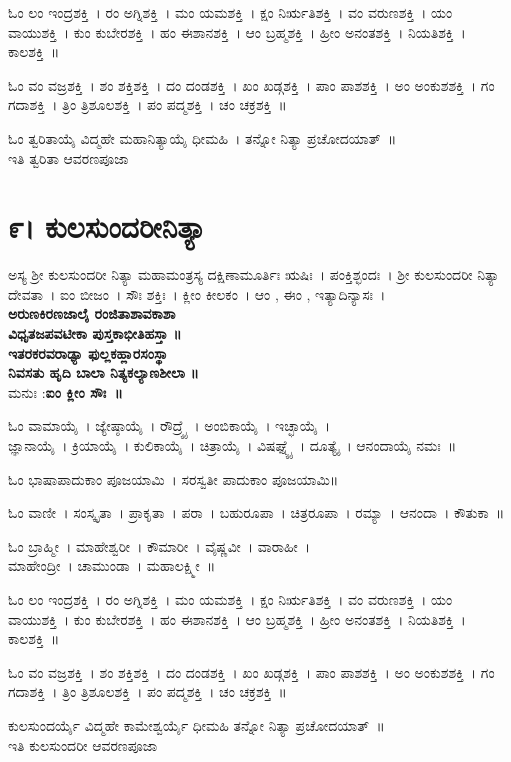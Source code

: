 ಓಂ ಲಂ ಇಂದ್ರಶಕ್ತಿ~।  ರಂ ಅಗ್ನಿಶಕ್ತಿ~।  ಮಂ ಯಮಶಕ್ತಿ~।  ಕ್ಷಂ ನಿರ್ಋತಿಶಕ್ತಿ~।  ವಂ ವರುಣಶಕ್ತಿ~।  ಯಂ ವಾಯುಶಕ್ತಿ~।  ಕುಂ ಕುಬೇರಶಕ್ತಿ~।  ಹಂ ಈಶಾನಶಕ್ತಿ~।  ಆಂ ಬ್ರಹ್ಮಶಕ್ತಿ~।  ಹ್ರೀಂ ಅನಂತಶಕ್ತಿ~।  ನಿಯತಿಶಕ್ತಿ~।  ಕಾಲಶಕ್ತಿ~॥ 

ಓಂ ವಂ ವಜ್ರಶಕ್ತಿ~।  ಶಂ ಶಕ್ತಿಶಕ್ತಿ~।  ದಂ ದಂಡಶಕ್ತಿ~।  ಖಂ ಖಡ್ಗಶಕ್ತಿ~।  ಪಾಂ ಪಾಶಶಕ್ತಿ~।  ಅಂ ಅಂಕುಶಶಕ್ತಿ~।  ಗಂ ಗದಾಶಕ್ತಿ~।  ತ್ರಿಂ ತ್ರಿಶೂಲಶಕ್ತಿ~।  ಪಂ ಪದ್ಮಶಕ್ತಿ~।  ಚಂ ಚಕ್ರಶಕ್ತಿ~॥ 

ಓಂ ತ್ವರಿತಾಯೈ ವಿದ್ಮಹೇ ಮಹಾನಿತ್ಯಾಯೈ ಧೀಮಹಿ~। ತನ್ನೋ ನಿತ್ಯಾ ಪ್ರಚೋದಯಾತ್~॥\\
ಇತಿ ತ್ವರಿತಾ ಆವರಣಪೂಜಾ
\section{೯। ಕುಲಸುಂದರೀನಿತ್ಯಾ}
ಅಸ್ಯ ಶ್ರೀ ಕುಲಸುಂದರೀ ನಿತ್ಯಾ ಮಹಾಮಂತ್ರಸ್ಯ ದಕ್ಷಿಣಾಮೂರ್ತಿಃ ಋಷಿಃ~। ಪಂಕ್ತಿಶ್ಛಂದಃ~। ಶ್ರೀ ಕುಲಸುಂದರೀ ನಿತ್ಯಾ ದೇವತಾ~। ಐಂ ಬೀಜಂ~। ಸೌಃ ಶಕ್ತಿಃ~। ಕ್ಲೀಂ ಕೀಲಕಂ~। ಆಂ , ಈಂ , ಇತ್ಯಾದಿನ್ಯಾಸಃ~।\\
{\bfseries ಅರುಣಕಿರಣಜಾಲೈ ರಂಜಿತಾಶಾವಕಾಶಾ\\
ವಿಧೃತಜಪವಟೀಕಾ ಪುಸ್ತಕಾಭೀತಿಹಸ್ತಾ ॥\\
ಇತರಕರವರಾಢ್ಯಾ ಫುಲ್ಲಕಹ್ಲಾರಸಂಸ್ಥಾ\\
ನಿವಸತು ಹೃದಿ ಬಾಲಾ ನಿತ್ಯಕಲ್ಯಾಣಶೀಲಾ ॥\\}
ಮನುಃ :{\bfseries  ಐಂ ಕ್ಲೀಂ ಸೌಃ~॥}

ಓಂ ವಾಮಾಯೈ~। ಜ್ಯೇಷ್ಠಾಯೈ~। ರೌದ್ರ್ಯೈ~। ಅಂಬಿಕಾಯೈ~। ಇಚ್ಛಾಯೈ~। \\ಜ್ಞಾನಾಯೈ~। ಕ್ರಿಯಾಯೈ~। ಕುಲಿಕಾಯೈ~। ಚಿತ್ರಾಯೈ~। ವಿಷಘ್ನ್ಯೈ~। ದೂತ್ಯೈ~। ಆನಂದಾಯೈ ನಮಃ~॥

ಓಂ ಭಾಷಾಪಾದುಕಾಂ ಪೂಜಯಾಮಿ~।  ಸರಸ್ವತೀ ಪಾದುಕಾಂ ಪೂಜಯಾಮಿ॥ 

ಓಂ ವಾಣೀ~।  ಸಂಸ್ಕೃತಾ~।  ಪ್ರಾಕೃತಾ~।  ಪರಾ~।  ಬಹುರೂಪಾ~।  ಚಿತ್ರರೂಪಾ~।  ರಮ್ಯಾ~।  ಆನಂದಾ~।  ಕೌತುಕಾ~॥ 

ಓಂ ಬ್ರಾಹ್ಮೀ~।  ಮಾಹೇಶ್ವರೀ~।  ಕೌಮಾರೀ~।  ವೈಷ್ಣವೀ~।  ವಾರಾಹೀ~। \\ ಮಾಹೇಂದ್ರೀ~।  ಚಾಮುಂಡಾ~।  ಮಹಾಲಕ್ಷ್ಮೀ~॥ 

ಓಂ ಲಂ ಇಂದ್ರಶಕ್ತಿ~।  ರಂ ಅಗ್ನಿಶಕ್ತಿ~।  ಮಂ ಯಮಶಕ್ತಿ~।  ಕ್ಷಂ ನಿರ್ಋತಿಶಕ್ತಿ~।  ವಂ ವರುಣಶಕ್ತಿ~।  ಯಂ ವಾಯುಶಕ್ತಿ~।  ಕುಂ ಕುಬೇರಶಕ್ತಿ~।  ಹಂ ಈಶಾನಶಕ್ತಿ~।  ಆಂ ಬ್ರಹ್ಮಶಕ್ತಿ~।  ಹ್ರೀಂ ಅನಂತಶಕ್ತಿ~।  ನಿಯತಿಶಕ್ತಿ~।  ಕಾಲಶಕ್ತಿ~॥ 

ಓಂ ವಂ ವಜ್ರಶಕ್ತಿ~।  ಶಂ ಶಕ್ತಿಶಕ್ತಿ~।  ದಂ ದಂಡಶಕ್ತಿ~।  ಖಂ ಖಡ್ಗಶಕ್ತಿ~।  ಪಾಂ ಪಾಶಶಕ್ತಿ~।  ಅಂ ಅಂಕುಶಶಕ್ತಿ~।  ಗಂ ಗದಾಶಕ್ತಿ~।  ತ್ರಿಂ ತ್ರಿಶೂಲಶಕ್ತಿ~।  ಪಂ ಪದ್ಮಶಕ್ತಿ~।  ಚಂ ಚಕ್ರಶಕ್ತಿ~॥ 

ಕುಲಸುಂದರ್ಯೈ ವಿದ್ಮಹೇ ಕಾಮೇಶ್ವರ್ಯೈ ಧೀಮಹಿ ತನ್ನೋ ನಿತ್ಯಾ ಪ್ರಚೋದಯಾತ್~॥\\
ಇತಿ ಕುಲಸುಂದರೀ ಆವರಣಪೂಜಾ
